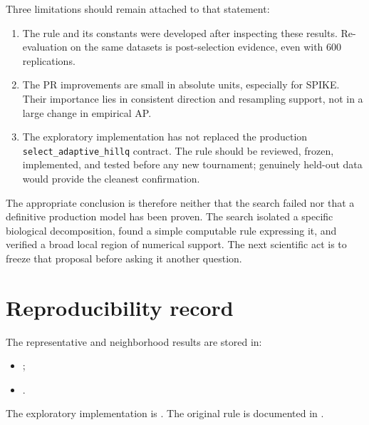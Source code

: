 \documentclass[11pt]{article}
\begin{document}
Three limitations should remain attached to that statement:
\begin{enumerate}
  \item The rule and its constants were developed after inspecting these
  results. Re-evaluation on the same datasets is post-selection evidence, even
  with 600 replications.
  \item The PR improvements are small in absolute units, especially for SPIKE.
  Their importance lies in consistent direction and resampling support, not in
  a large change in empirical AP.
  \item The exploratory implementation has not replaced the production
  \texttt{select\_adaptive\_hillq} contract. The rule should be reviewed,
  frozen, implemented, and tested before any new tournament; genuinely held-out
  data would provide the cleanest confirmation.
\end{enumerate}

The appropriate conclusion is therefore neither that the search failed nor
that a definitive production model has been proven. The search isolated a
specific biological decomposition, found a simple computable rule expressing
it, and verified a broad local region of numerical support. The next scientific
act is to freeze that proposal before asking it another question.

\section*{Reproducibility record}

The representative and neighborhood results are stored in:
\begin{itemize}
  \item {};
  \item {}.
\end{itemize}
The exploratory implementation is
.
The original rule is documented in
.
\end{document}
